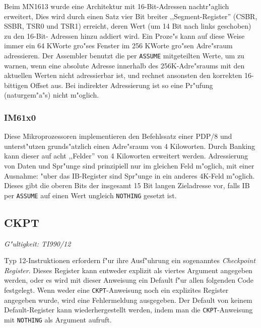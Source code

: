 \documentclass[12pt,a4paper,twoside]{report}
\makeatletter
\newcommand{\tty}[1]{{\tt #1}}
\newcommand{\ttindex}[1]{\index{#1@{\tt #1}}}
\makeatother
\begin{document}
Beim MN1613 wurde eine Architektur mit 16-Bit-Adressen nachtr"aglich erweitert,
Dies wird durch einen Satz vier Bit breiter ,,Segment-Register'' (CSBR, SSBR, TSR0
und TSR1) erreicht, deren Wert (um 14 Bit nach links geschoben) zu den 16-Bit-
Adressen hinzu addiert wird.  Ein Proze"s kann auf diese Weise immer ein 64 KWorte
gro"ses Fenster im 256 KWorte gro"sen Adre"sraum adressieren.  Der Assembler
benutzt die per \tty{ASSUME} mitgeteilten Werte, um zu warnen, wenn eine absolute
Adresse innerhalb des 256K-Adre"sraums mit den aktuellen Werten nicht adressierbar
ist, und rechnet ansonsten den korrekten 16-bittigen Offset aus.  Bei indirekter
Adressierung ist so eine Pr"ufung (naturgem"a"s) nicht m"oglich.


\subsubsection{IM61x0}

Diese Mikroprozessoren implementieren den Befehlssatz einer PDP/8 und unterst"utzen
grunds"atzlich einen Adre"sraum von 4 Kiloworten.  Durch Banking kann dieser
auf acht ,,Felder'' von 4 Kiloworten erweitert werden.  Adressierung von Daten
und Spr"unge sind prinzipiell nur im gleichen Feld m"oglich, mit einer Ausnahme:
"uber das IB-Register sind Spr"unge in ein anderes 4K-Feld m"oglich.  Dieses gibt
die oberen Bits der insgesamt 15 Bit langen Zieladresse vor, falls IB per \tty{ASSUME}
auf einen Wert ungleich \tty{NOTHING} gesetzt ist.


\subsection{CKPT}
\ttindex{CKPT}

{\em G"ultigkeit: TI990/12}

Typ 12-Instruktionen erfordern f"ur ihre Ausf"uhrung ein sogenanntes {\em Checkpoint
Register}.  Dieses Register kann entweder explizit als viertes Argument angegeben
werden, oder es wird mit dieser Anweisung ein Default f"ur allen folgenden Code
festgelegt.  Wenn weder eine \tty{CKPT}-Anweisung noch ein explizites Register
angegeben wurde, wird eine Fehlermeldung ausgegeben. Der Default von keinem
Default-Register kann wiederhergestellt werden, indem man die \tty{CKPT}-Anweisung
mit {\tt NOTHING} als Argument aufruft.
\end{document}
